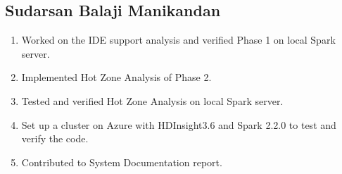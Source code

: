 \subsection{Sudarsan Balaji Manikandan}
\begin{enumerate}
    \item Worked on the IDE support analysis and verified Phase 1 on local Spark server.
    \item Implemented Hot Zone Analysis of Phase 2.
    \item Tested and verified Hot Zone Analysis on local Spark server.
    \item Set up a cluster on Azure with HDInsight3.6 and Spark 2.2.0 to test and verify the code.
    \item Contributed to System Documentation report.
\end{enumerate}



\newpage



